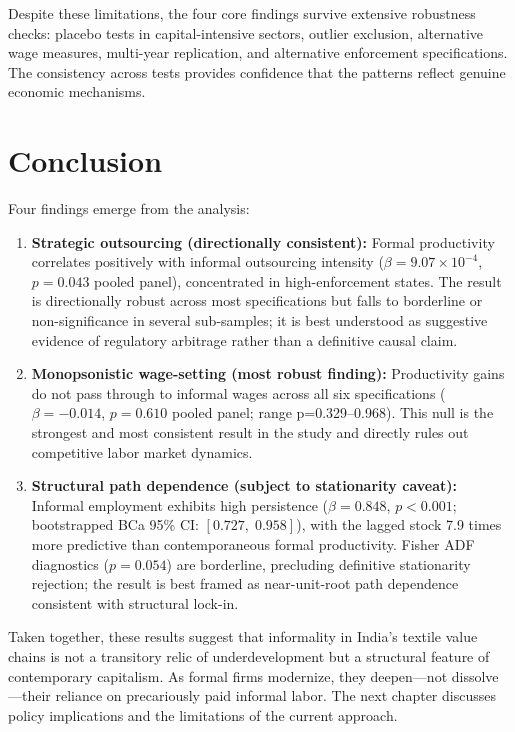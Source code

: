 Despite these limitations, the four core findings survive extensive robustness checks: placebo tests in capital-intensive sectors, outlier exclusion, alternative wage measures, multi-year replication, and alternative enforcement specifications. The consistency across tests provides confidence that the patterns reflect genuine economic mechanisms.

\section{Conclusion}
\label{sec:results_conclusion}

Four findings emerge from the analysis:

\begin{enumerate}
	\item \textbf{Strategic outsourcing (directionally consistent):} Formal productivity correlates positively with informal outsourcing intensity ($\beta = 9.07 \times 10^{-4}$, $p=0.043$ pooled panel), concentrated in high-enforcement states. The result is directionally robust across most specifications but falls to borderline or non-significance in several sub-samples; it is best understood as suggestive evidence of regulatory arbitrage rather than a definitive causal claim.
	
	\item \textbf{Monopsonistic wage-setting (most robust finding):} Productivity gains do not pass through to informal wages across all six specifications ($\beta = -0.014$, $p=0.610$ pooled panel; range p=0.329--0.968). This null is the strongest and most consistent result in the study and directly rules out competitive labor market dynamics.
	
	\item \textbf{Structural path dependence (subject to stationarity caveat):} Informal employment exhibits high persistence ($\beta=0.848$, $p<0.001$; bootstrapped BCa 95\% CI: $[0.727,\; 0.958]$), with the lagged stock 7.9 times more predictive than contemporaneous formal productivity. Fisher ADF diagnostics ($p=0.054$) are borderline, precluding definitive stationarity rejection; the result is best framed as near-unit-root path dependence consistent with structural lock-in.
\end{enumerate}

Taken together, these results suggest that informality in India's textile value chains is not a transitory relic of underdevelopment but a structural feature of contemporary capitalism. As formal firms modernize, they deepen—not dissolve—their reliance on precariously paid informal labor. The next chapter discusses policy implications and the limitations of the current approach.
